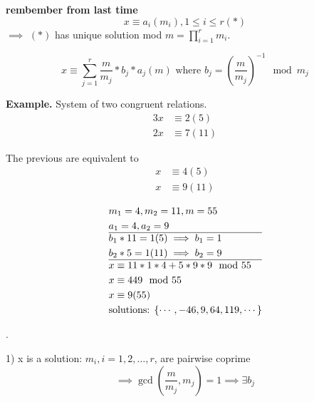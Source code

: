 

\textbf{rembember from last time}
\[
  x \equiv a_i (m_i), 1 \leq i \leq r (*)
\]
$\implies$ $(*)$ has unique solution mod $m = \prod_{i = 1}^r m_i$. 

\[
  x \equiv \sum_{j=1}^r \frac {m}{m_j} * b_j * a_j (m) \text{ where }
  b_j = \left( \frac{m}{m_j} \right) ^{-1} \mod m_j
\]

\textbf{Example.}
System of two congruent relations.
\begin{align*}
  3x &\equiv 2 (5) \\
  2x &\equiv 7 (11)
\end{align*}

The previous are equivalent to
\begin{align*}
  x &\equiv 4 (5) \\
  x &\equiv 9 (11)
\end{align*}

\begin{align*}
  &m_1 = 4, m_2 = 11, m = 55 \\
  &a_1 = 4, a_2 = 9 \\
  \hline
  &b_1 * 11 = 1 (5)  \implies b_1 = 1 \\
  &b_2 *5 = 1 (11) \implies b_2 = 9 \\
  \hline
  & x \equiv 11 * 1 * 4 + 5 *9 *9 \mod 55\\
  & x \equiv 449 \mod 55 \\
  & x \equiv 9 (55) \\
  & \text{solutions: } \{\cdots, -46, 9, 64, 119, \cdots \}
\end{align*}

\Proof.

1) x is a solution: $m_i, i = 1,2, \ldots, r$, are pairwise coprime 
\[
  \implies \gcd\left(\frac{m}{m_j}, m_j\right) = 1 \implies \exists b_j
\]

